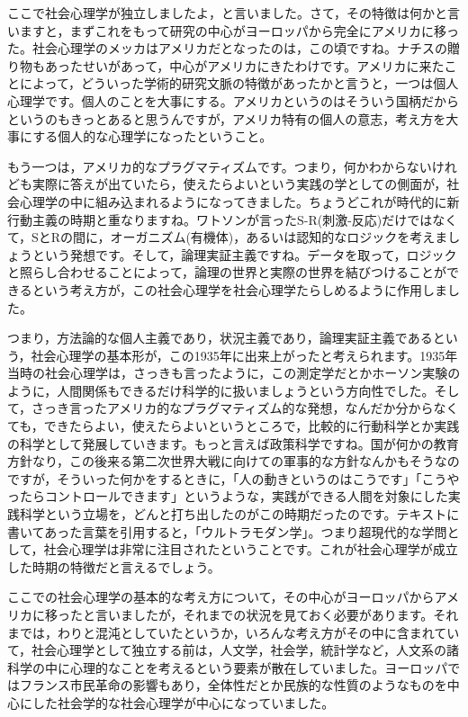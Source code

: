 \documentclass{ltjsbook}
\begin{document}
ここで社会心理学が独立しましたよ，と言いました。さて，その特徴は何かと言いますと，まずこれをもって研究の中心がヨーロッパから完全にアメリカに移った。社会心理学のメッカはアメリカだとなったのは，この頃ですね。ナチスの贈り物もあったせいがあって，中心がアメリカにきたわけです。アメリカに来たことによって，どういった学術的研究文脈の特徴があったかと言うと，一つは個人心理学です。個人のことを大事にする。アメリカというのはそういう国柄だからというのもきっとあると思うんですが，アメリカ特有の個人の意志，考え方を大事にする個人的な心理学になったということ。

もう一つは，アメリカ的なプラグマティズムです。つまり，何かわからないけれども実際に答えが出ていたら，使えたらよいという実践の学としての側面が，社会心理学の中に組み込まれるようになってきました。ちょうどこれが時代的に新行動主義の時期と重なりますね。ワトソンが言ったS-R(刺激-反応)だけではなくて，SとRの間に，オーガニズム(有機体)，あるいは認知的なロジックを考えましょうという発想です。そして，論理実証主義ですね。データを取って，ロジックと照らし合わせることによって，論理の世界と実際の世界を結びつけることができるという考え方が，この社会心理学を社会心理学たらしめるように作用しました。

つまり，方法論的な個人主義であり，状況主義であり，論理実証主義であるという，社会心理学の基本形が，この1935年に出来上がったと考えられます。1935年当時の社会心理学は，さっきも言ったように，この測定学だとかホーソン実験のように，人間関係もできるだけ科学的に扱いましょうという方向性でした。そして，さっき言ったアメリカ的なプラグマティズム的な発想，なんだか分からなくても，できたらよい，使えたらよいというところで，比較的に行動科学とか実践の科学として発展していきます。もっと言えば政策科学ですね。国が何かの教育方針なり，この後来る第二次世界大戦に向けての軍事的な方針なんかもそうなのですが，そういった何かをするときに，「人の動きというのはこうです」「こうやったらコントロールできます」というような，実践ができる人間を対象にした実践科学という立場を，どんと打ち出したのがこの時期だったのです。テキストに書いてあった言葉を引用すると，「ウルトラモダン学」。つまり超現代的な学問として，社会心理学は非常に注目されたということです。これが社会心理学が成立した時期の特徴だと言えるでしょう。

ここでの社会心理学の基本的な考え方について，その中心がヨーロッパからアメリカに移ったと言いましたが，それまでの状況を見ておく必要があります。それまでは，わりと混沌としていたというか，いろんな考え方がその中に含まれていて，社会心理学として独立する前は，人文学，社会学，統計学など，人文系の諸科学の中に心理的なことを考えるという要素が散在していました。ヨーロッパではフランス市民革命の影響もあり，全体性だとか民族的な性質のようなものを中心にした社会学的な社会心理学が中心になっていました。
\end{document}
